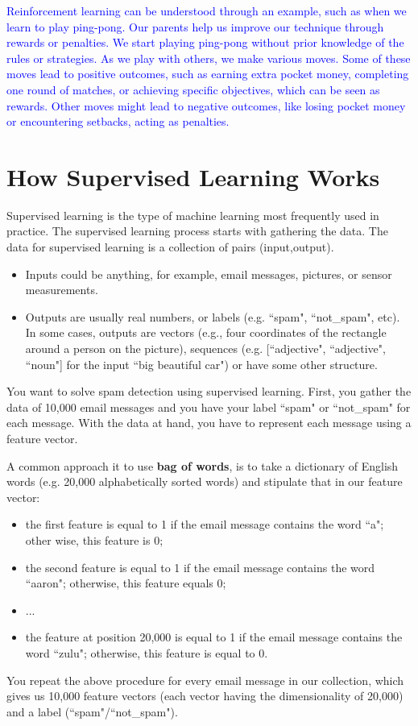 \textcolor{blue}{Reinforcement learning can be understood through an example, such as when we learn to play ping-pong. Our parents help us improve our technique through rewards or penalties. We start playing ping-pong without prior knowledge of the rules or strategies. As we play with others, we make various moves. Some of these moves lead to positive outcomes, such as earning extra pocket money, completing one round of matches, or achieving specific objectives, which can be seen as rewards. Other moves might lead to negative outcomes, like losing pocket money or encountering setbacks, acting as penalties.
}


\section{How Supervised Learning Works}
Supervised learning is the type of machine learning most frequently used in practice. The supervised learning process starts with gathering the data. The data for supervised learning is a collection of pairs (input,output).
\begin{itemize}
	\item Inputs could be anything, for example, email messages, pictures, or sensor measurements.
	\item Outputs are usually real numbers, or labels (e.g. ``spam", ``not\_spam", etc). In some cases, outputs are vectors (e.g., four coordinates of the rectangle around a person on the picture), sequences (e.g. [``adjective", ``adjective", ``noun"] for the input ``big beautiful car") or have some other structure.
\end{itemize}
You want to solve spam detection using supervised learning. First, you gather the data of 10,000 email messages and you have your label ``spam" or ``not\_spam" for each message. With the data at hand, you have to represent each message using a feature vector.

A common approach it to use \textbf{bag of words}, is to take a dictionary of English words (e.g. 20,000 alphabetically sorted words) and stipulate that in our feature vector:
\begin{itemize}
	\item the first feature is equal to 1 if the email message contains the word ``a"; other wise, this feature is 0;
	\item the second feature is equal to 1 if the email message contains the word ``aaron"; otherwise, this feature equals 0;
	\item ...
	\item the feature at position 20,000 is equal to 1 if the email message contains the word ``zulu"; otherwise, this feature is equal to 0.
\end{itemize}
You repeat the above procedure for every email message in our collection, which gives us 10,000 feature vectors (each vector having the dimensionality of 20,000) and a label (``spam"/``not\_spam").

